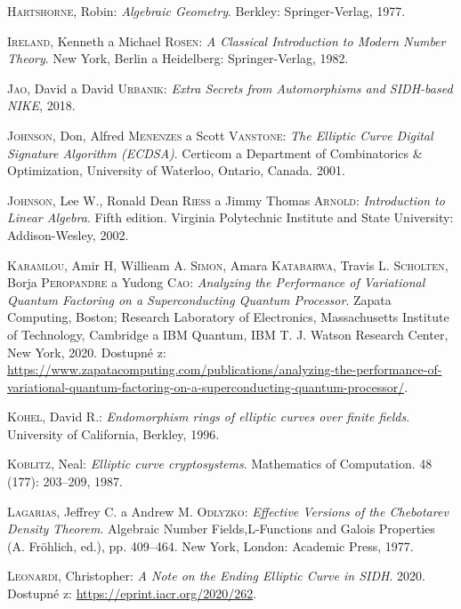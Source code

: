 \documentclass[12pt]{report}
\begin{document}
\begin{thebibliography}{97}
\textsc{Hartshorne}, Robin: \textit{Algebraic  Geometry}. Berkley: Springer-Verlag, 1977.

\textsc{Ireland}, Kenneth a Michael \textsc{Rosen}: \textit{A Classical Introduction to Modern Number Theory}. New York, Berlin a Heidelberg: Springer-Verlag, 1982.

\textsc{Jao}, David a David \textsc{Urbanik}: \textit{Extra Secrets from Automorphisms and SIDH-based NIKE}, 2018.

\textsc{Johnson}, Don, Alfred \textsc{Menenzes} a Scott \textsc{Vanstone}: \textit{The Elliptic Curve Digital Signature Algorithm (ECDSA)}. Certicom a Department of Combinatorics \& Optimization, University of Waterloo,  Ontario, Canada. 2001.

\textsc{Johnson}, Lee W., Ronald Dean \textsc{Riess} a Jimmy Thomas \textsc{Arnold}: \textit{Introduction to Linear Algebra}. Fifth edition. Virginia Polytechnic Institute and State University: Addison-Wesley, 2002.

\textsc{Karamlou}, Amir H, Willieam A. \textsc{Simon}, Amara \textsc{Katabarwa}, Travis L. \textsc{Scholten}, Borja \textsc{Peropandre} a Yudong \textsc{Cao}: \textit{Analyzing the Performance of Variational Quantum Factoring on a Superconducting Quantum Processor}. Zapata Computing, Boston; Research Laboratory of Electronics, Massachusetts Institute of Technology, Cambridge a IBM Quantum, IBM T. J. Watson Research Center, New York, 2020. Dostupné z: \url{https://www.zapatacomputing.com/publications/analyzing-the-performance-of-variational-quantum-factoring-on-a-superconducting-quantum-processor/}.

\textsc{Kohel}, David R.: \textit{Endomorphism rings of elliptic curves over finite fields}. University of California, Berkley, 1996.

\textsc{Koblitz}, Neal: \textit{Elliptic curve cryptosystems}. Mathematics of Computation. 48 (177): 203–209, 1987.

\textsc{Lagarias}, Jeffrey C. a Andrew M. \textsc{Odlyzko}: \textit{Effective Versions of the Chebotarev Density Theorem}. Algebraic Number Fields,L-Functions and Galois Properties (A. Fröhlich, ed.), pp. 409–464. New York, London: Academic Press, 1977.

\textsc{Leonardi}, Christopher: \textit{A Note on the Ending Elliptic Curve in SIDH}. 2020. Dostupné z: \url{https://eprint.iacr.org/2020/262}.


\end{thebibliography}
\end{document}
